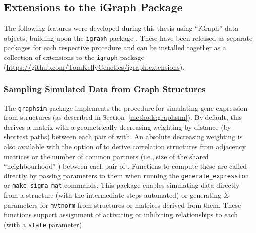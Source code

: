 
\subsection{Extensions to the iGraph Package} \label{methods:igraph_extensions}
The following features were developed during this thesis using ``iGraph'' data objects, building upon the \texttt{igraph} package \citep{igraph}. These have been released as separate packages for each respective procedure and can be installed together as a collection of extensions to the \texttt{igraph} package (\url{https://github.com/TomKellyGenetics/igraph.extensions}).

\subsubsection{Sampling Simulated Data from Graph Structures}
The \texttt{graphsim} package implements the procedure for simulating \gls{gene expression} from  structures (as described in Section~\ref{methods:graphsim}). By default, this derives a matrix with a geometrically decreasing weighting by distance (by \glspl{shortest path}) between each pair of  with. An absolute decreasing weighting is also available with the option of to derive correlation structures from adjacency matrices or the number of  common partners (i.e., size of the shared ``neighbourhood'' \citep{Hell1976}) between each pair of . Functions to compute these are called directly by passing parameters to them when running the \texttt{generate\_expression} or \texttt{make\_sigma\_mat} commands. This package enables simulating  data directly from a  structure (with the intermediate steps automated) or generating $\Sigma$ parameters for \texttt{mvtnorm} from  structures or matrices derived from them. These functions support assignment of activating or inhibiting relationships to each  (with a \texttt{state} parameter).

